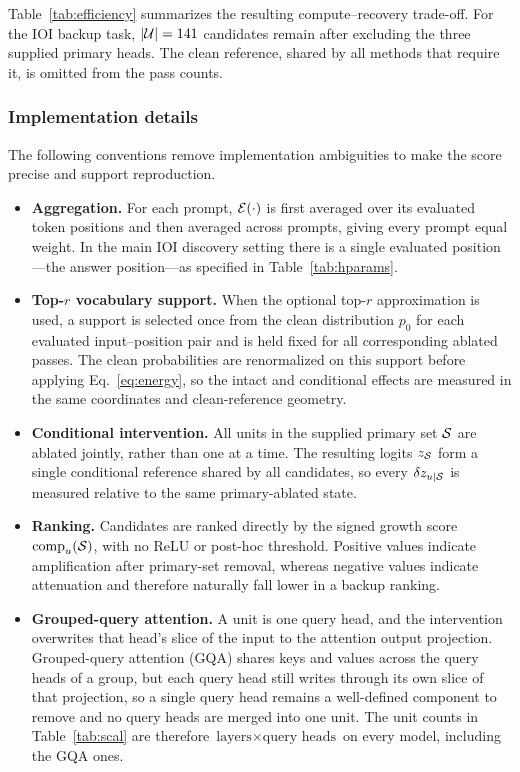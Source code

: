 Table~\ref{tab:efficiency} summarizes the resulting compute--recovery trade-off.
For the IOI backup task, $|\mathcal{U}|=141$ candidates remain after excluding the
three supplied primary heads.
The clean reference, shared by all methods that require it, is omitted from
the pass counts.

\subsubsection{Implementation details}

The following conventions remove implementation ambiguities to make the score precise and support reproduction.

\begin{itemize}

\item \textbf{Aggregation.}
For each prompt, $\mathcal{E}(\cdot)$ is first averaged over its evaluated token positions and then averaged across prompts, giving every prompt equal weight.
In the main IOI discovery setting there is a single evaluated position---the answer position---as specified in Table~\ref{tab:hparams}.

\item \textbf{Top-$r$ vocabulary support.}
When the optional top-$r$ approximation is used, a support is selected once from the clean distribution $p_0$ for each evaluated input--position pair and
is held fixed for all corresponding ablated passes.
The clean probabilities are renormalized on this support before applying Eq.~\ref{eq:energy}, so the intact and conditional effects are measured in the
same coordinates and clean-reference geometry.

\item \textbf{Conditional intervention.}
All units in the supplied primary set $\mathcal{S}$ are ablated jointly, rather than one at a time.
The resulting logits $z_{\mathcal{S}}$ form a single conditional reference shared by all candidates, so every $\delta z_{u\mid\mathcal{S}}$ is measured relative to the same primary-ablated state.

\item \textbf{Ranking.}
Candidates are ranked directly by the signed growth score $\mathrm{comp}_u(\mathcal{S})$, with no ReLU or post-hoc threshold.
Positive values indicate amplification after primary-set removal, whereas negative values indicate attenuation and therefore naturally fall lower in a
backup ranking.

\item \textbf{Grouped-query attention.}
A unit is one query head, and the intervention overwrites that head's slice of the input to the attention output projection.
Grouped-query attention (GQA) shares keys and values across the query heads of a group, but each query head still writes through its own slice of that projection, so a single query head remains a well-defined component to remove and no query heads are merged into one unit.
The unit counts in Table~\ref{tab:scal} are therefore $\text{layers}\times\text{query heads}$ on every model, including the GQA ones.

\end{itemize}

